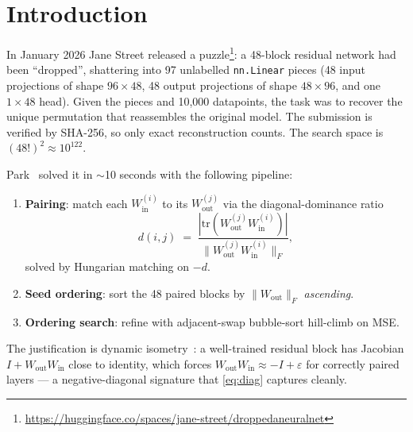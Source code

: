 \documentclass[10pt]{article}
\theoremstyle{remark}
\begin{document}
\section{Introduction}

In January 2026 Jane Street released a puzzle\footnote{\url{https://huggingface.co/spaces/jane-street/droppedaneuralnet}}:
a 48-block residual network had been ``dropped'', shattering into 97
unlabelled \texttt{nn.Linear} pieces (48 input projections of shape $96\times 48$,
48 output projections of shape $48\times 96$, and one $1\times 48$ head).
Given the pieces and 10,000 datapoints, the task was to recover the unique
permutation that reassembles the original model. The submission is verified
by SHA-256, so only exact reconstruction counts. The search space is
$(48!)^2 \approx 10^{122}$.

Park~\cite{park2026} solved it in $\sim$10 seconds with the following
pipeline:
\begin{enumerate}[leftmargin=*,itemsep=0pt]
  \item \textbf{Pairing}: match each $W_{\mathrm{in}}^{(i)}$ to its
        $W_{\mathrm{out}}^{(j)}$ via the diagonal-dominance ratio
        \begin{equation}\label{eq:diag}
          d(i,j) \;=\; \frac{|\mathrm{tr}(W_{\mathrm{out}}^{(j)} W_{\mathrm{in}}^{(i)})|}{\|W_{\mathrm{out}}^{(j)} W_{\mathrm{in}}^{(i)}\|_F},
        \end{equation}
        solved by Hungarian matching on $-d$.
  \item \textbf{Seed ordering}: sort the 48 paired blocks by $\|W_{\mathrm{out}}\|_F$ \emph{ascending}.
  \item \textbf{Ordering search}: refine with adjacent-swap bubble-sort hill-climb on MSE.
\end{enumerate}
The justification is dynamic isometry~\cite{pennington2017isometry}: a
well-trained residual block has Jacobian $I + W_{\mathrm{out}}W_{\mathrm{in}}$
close to identity, which forces $W_{\mathrm{out}}W_{\mathrm{in}} \approx -I + \varepsilon$
for correctly paired layers --- a negative-diagonal signature that
\eqref{eq:diag} captures cleanly.
\end{document}

